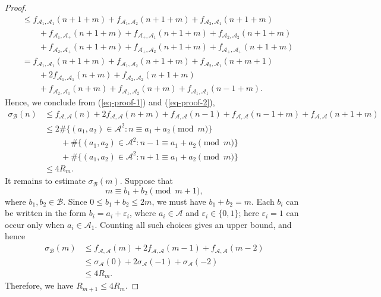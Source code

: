 \documentclass[10pt,a4paper]{amsart}
\begin{document}
\begin{proof}
\begin{align}
    &\le f_{\mathcal{A}_{1},\mathcal{A}_{1}}(n+1+m)+f_{\mathcal{A}_{1},\mathcal{A}_{2}}(n+1+m)
    +f_{\mathcal{A}_{2},\mathcal{A}_{1}}(n+1+m)\nonumber\\
    &\quad \quad +f_{\mathcal{A}_{1},\mathcal{A}_{+}}(n+1+m)+f_{\mathcal{A}_{+},\mathcal{A}_{1}}(n+1+m)+f_{\mathcal{A}_{2},\mathcal{A}_{2}}(n+1+m)\nonumber\\
    &\quad \quad +f_{\mathcal{A}_{2},\mathcal{A}_{+}}(n+1+m)+f_{\mathcal{A}_{+},\mathcal{A}_{2}}(n+1+m)+f_{\mathcal{A}_{+},\mathcal{A}_{+}}(n+1+m)\nonumber\\
    &= f_{\mathcal{A}_{1},\mathcal{A}_{1}}(n+1+m)+f_{\mathcal{A}_{1},\mathcal{A}_{2}}(n+1+m)
    +f_{\mathcal{A}_{2},\mathcal{A}_{1}}(n+m+1)\nonumber\\
    &\quad \quad +2f_{\mathcal{A}_{1},\mathcal{A}_{1}}(n+m)+f_{\mathcal{A}_{2},\mathcal{A}_{2}}(n+1+m)\nonumber\\
    &\quad \quad +f_{\mathcal{A}_{2},\mathcal{A}_{1}}(n+m)+f_{\mathcal{A}_{1},\mathcal{A}_{2}}(n+m)+f_{\mathcal{A}_{1},\mathcal{A}_{1}}(n-1+m).
\end{align}
Hence, we conclude from (\ref{eq-proof-1}) and (\ref{eq-proof-2}),
\begin{align}\label{eq-proof-3}
    \sigma_{\mathcal{B}}(n)&\le f_{\mathcal{A},\mathcal{A}}(n)+2f_{\mathcal{A},\mathcal{A}}(n+m)+f_{\mathcal{A},\mathcal{A}}(n-1)+f_{\mathcal{A},\mathcal{A}}(n-1+m)+f_{\mathcal{A},\mathcal{A}}(n+1+m)\nonumber\\
    &\le 2\#\big\{(a_1,a_2)\in \mathcal{A}^2: n\equiv a_1+a_2 \pmod{m}\big\}\nonumber\\
    &\quad \quad +\#\big\{(a_1,a_2)\in \mathcal{A}^2: n-1\equiv a_1+a_2\pmod{m}\big\}\nonumber\\
    &\quad \quad +\#\big\{(a_1,a_2)\in \mathcal{A}^2: n+1\equiv a_1+a_2\pmod{m}\big\}\nonumber\\
    &\le 4R_m.
\end{align}
It remains to estimate $\sigma_{\mathcal B}(m)$. Suppose that
$$
m\equiv b_1+b_2\pmod{m+1},
$$
where $b_1,b_2\in\mathcal B$. Since $0\le b_1+b_2\le 2m$, we must have $b_1+b_2=m$. Each $b_i$ can be written in the form $b_i=a_i+\varepsilon_i$, where $a_i\in\mathcal A$ and $\varepsilon_i\in\{0,1\}$; here $\varepsilon_i=1$ can occur only when $a_i\in\mathcal A_1$. Counting all such choices gives an upper bound, and hence
\begin{align*}
\sigma_{\mathcal B}(m)
&\le f_{\mathcal A,\mathcal A}(m)+2f_{\mathcal A,\mathcal A}(m-1)+f_{\mathcal A,\mathcal A}(m-2)\\
&\le \sigma_{\mathcal A}(0)+2\sigma_{\mathcal A}(-1)+\sigma_{\mathcal A}(-2)\\
&\le 4R_m.
\end{align*}
Therefore, we have $R_{m+1}\le 4 R_m$.


\end{proof}
\end{document}
